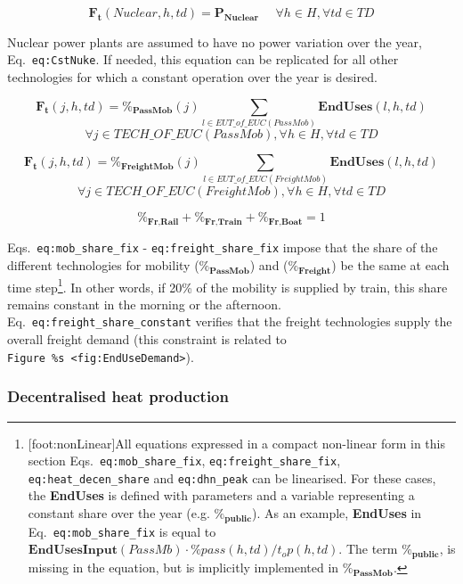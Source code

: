 \documentclass[
]{article}
\begin{document}
{\[\textbf{F}_\textbf{t} (Nuclear,h,td) = \textbf{P}_\textbf{Nuclear}  ~~~~~~ \forall h \in H, \forall td \in TD\]}

Nuclear power plants are assumed to have no power variation over the
year, Eq.~\texttt{eq:CstNuke}. If needed, this equation can be
replicated for all other technologies for which a constant operation
over the year is desired.

{\[\textbf{F}_\textbf{t} (j,h,td) = \textbf{\%}_\textbf{PassMob} (j)   \sum_{l \in EUT\_of\_EUC(PassMob)} \textbf{EndUses}(l,h,td)
\]\[\forall j \in TECH\_OF\_EUC(PassMob) , \forall h \in H, \forall td \in TD\]}

{\[\textbf{F}_\textbf{t} (j,h,td) = \textbf{\%}_\textbf{FreightMob} (j)   \sum_{l \in EUT\_of\_EUC(FreightMob)} \textbf{EndUses}(l,h,td)
\]\[\forall j \in TECH\_OF\_EUC(FreightMob) , \forall h \in H, \forall td \in TD\]}

{\[\textbf{\%}_\textbf{Fr,Rail} + \textbf{\%}_\textbf{Fr,Train} + \textbf{\%}_\textbf{Fr,Boat} = 1
\]}

Eqs.~\texttt{eq:mob\_share\_fix} - \texttt{eq:freight\_share\_fix}
impose that the share of the different technologies for mobility
(\(\textbf{\%}_{\textbf{PassMob}}
\)) and (\(\textbf{\%}_{\textbf{Freight}}
\)) be the same at each time step\footnote{{[}foot:nonLinear{]}All
  equations expressed in a compact non-linear form in this section
  Eqs.~\texttt{eq:mob\_share\_fix}, \texttt{eq:freight\_share\_fix},
  \texttt{eq:heat\_decen\_share} and \texttt{eq:dhn\_peak} can be
  linearised. For these cases, the \textbf{EndUses} is defined with
  parameters and a variable representing a constant share over the year
  (e.g. \(\textbf{\%}_\textbf{public}
  \)). As an example, \textbf{EndUses} in
  Eq.~\texttt{eq:mob\_share\_fix} is equal to
  \(\textbf{EndUsesInput}(PassMb) \cdot \%pass (h, td) / t_op (h, td)
  \). The term \(\textbf{\%}_{\textbf{public}}
  \), is missing in the equation, but is implicitly implemented in
  \(\textbf{\%}_{\textbf{PassMob}}
  \).}. In other words, if 20\% of the mobility is supplied by train,
this share remains constant in the morning or the afternoon.
Eq.~\texttt{eq:freight\_share\_constant} verifies that the freight
technologies supply the overall freight demand (this constraint is
related to
\texttt{Figure\ \%s\ \textless{}fig:EndUseDemand\textgreater{}}).

\subsubsection{Decentralised heat
production}\label{decentralised-heat-production}
\end{document}
